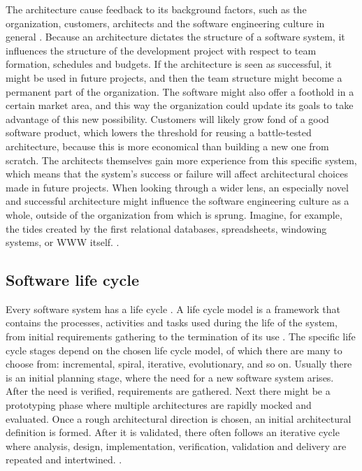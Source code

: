 \documentclass[utf8,english]{gradu3}
\begin{document}
The architecture cause feedback to its background factors, such as the
organization, customers, architects and the software engineering culture in
general \parencite{Bass1998}. Because an architecture dictates the structure of a software
system, it influences the structure of the development project with respect to
team formation, schedules and budgets. If the architecture is seen as
successful, it might be used in future projects, and then the team structure
might become a permanent part of the organization. The software might also offer
a foothold in a certain market area, and this way the organization could update
its goals to take advantage of this new possibility. Customers will likely grow
fond of a good software product, which lowers the threshold for reusing a
battle-tested architecture, because this is more economical than building a new
one from scratch. The architects themselves gain more experience from this
specific system, which means that the system's success or failure will affect
architectural choices made in future projects. When looking through a wider
lens, an especially novel and successful architecture might influence the
software engineering culture as a whole, outside of the organization from which
is sprung. Imagine, for example, the tides created by the first relational
databases, spreadsheets, windowing systems, or WWW itself. \parencite[10-11]{Bass1998}.


\subsection{Software life cycle}
Every software system has a life cycle \parencite[17]{IEEE12207}. A life cycle model is a
framework that contains the processes, activities and tasks used during the life
of the system, from initial requirements gathering to the termination of its use
\parencite[3]{IEEE42010}. The specific life cycle stages depend on the chosen life cycle
model, of which there are many to choose from: incremental, spiral, iterative,
evolutionary, and so on. Usually there is an initial planning stage, where the
need for a new software system arises. After the need is verified, requirements
are gathered. Next there might be a prototyping phase where multiple
architectures are rapidly mocked and evaluated. Once a rough architectural
direction is chosen, an initial architectural definition is formed. After it is
validated, there often follows an iterative cycle where analysis, design,
implementation, verification, validation and delivery are repeated and
intertwined. \parencite[18]{IEEE12207}.
\end{document}
